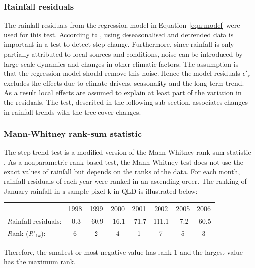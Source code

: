 \documentclass[draft,linenumbers]{agujournal}
\begin{document}
\begin{article}
\subsubsection{Rainfall residuals} %

The rainfall residuals from the regression model in Equation~\ref{eqn:model} were used for this test. According to \citet{Hirsch1985}, using deseasonalised and detrended data is important in a test to detect step change. Furthermore, since rainfall is only partially attributed to local sources and conditions, noise can be introduced by large scale dynamics and changes in other climatic factors. The assumption is that the regression model should remove this noise. Hence the model residuals $\epsilon'_r$ excludes the effects due to climate drivers, seasonality and the long term trend. As a result local effects are assumed to explain at least part of the variation in the residuals. The  test, described in the following sub section, associates changes in rainfall trends with the tree cover changes. 


\subsubsection{Mann-Whitney rank-sum statistic}

The step trend test is a modified version of the Mann-Whitney rank-sum statistic \citep{Hirsch1985}. As a nonparametric rank-based test, the Mann-Whitney test does not use the exact values of rainfall but depends on the ranks of the data. For each month, rainfall residuals of each year were ranked in an ascending order. The ranking of January rainfall in a sample pixel k in QLD is illustrated below:\\

  \begin{tabular}{lccccccc}
  & 1998 & 1999 & 2000 & 2001 & 2002 & 2005 & 2006\\
  \textit Rainfall residuals: & -0.3 & -60.9 & -16.1 & -71.7 & 111.1 & -7.2 & -60.5 \\
  \textit Rank ($R'_{1k}$): & 6 & 2 & 4 & 1 & 7 & 5 & 3\\
  \end{tabular}
\noindent Therefore, the smallest or most negative value has rank 1 and the largest value has the maximum rank.


\end{article}
\end{document}
